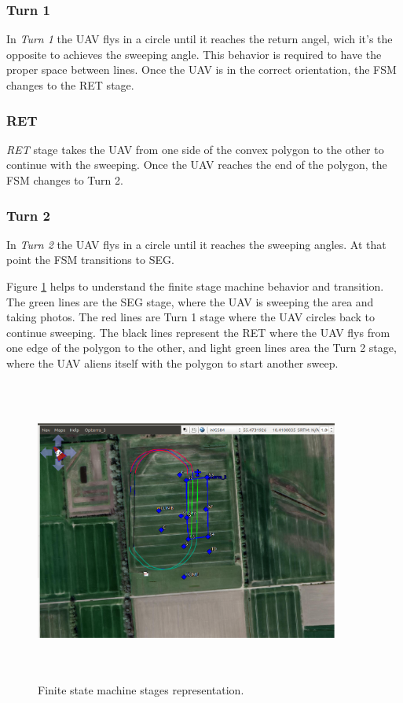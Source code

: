 \subsubsection{Turn 1}
In \textit{Turn 1} the UAV flys in a circle until it reaches the return angel, wich it's the opposite to achieves the sweeping angle. This behavior is required to have the proper space between lines. Once the UAV is in the correct orientation, the FSM changes to the RET stage.
\subsubsection{RET}
\textit{RET} stage takes the UAV from one side of the convex polygon to the other to continue with the sweeping. Once the UAV reaches the end of the polygon, the FSM changes to Turn 2.
\subsubsection{Turn 2}
In \textit{Turn 2} the UAV flys in a circle until it reaches the sweeping angles. At that point the FSM transitions to SEG.

Figure \ref{fig:FSM_example} helps to understand the finite stage machine behavior and transition.  The green lines are the SEG stage, where the UAV is sweeping the area and taking photos. The red lines are Turn 1 stage where the UAV circles back to continue sweeping. The black lines represent the RET where the UAV flys from one edge of the polygon to the other, and light green lines area the Turn 2 stage, where the UAV aliens itself with the polygon to start another sweep. 
\begin{figure}[H]
\centering
\includegraphics[width=10cm,height=10cm,keepaspectratio]{imagenes/FSM_example.png}
\caption{Finite state machine stages representation.}
\label{fig:FSM_example}
\end{figure}

